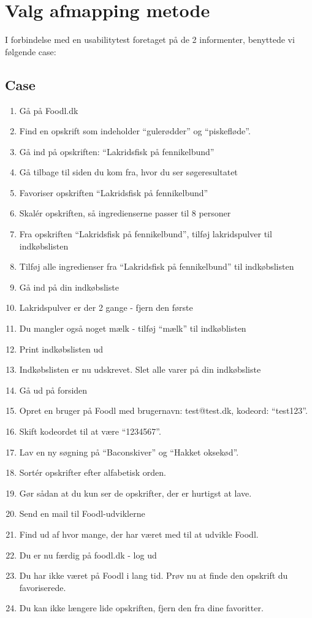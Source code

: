 \chapter{Valg afmapping metode}
\label{ap:usabilitytest}

I forbindelse med en usabilitytest foretaget på de 2 informenter, benyttede vi følgende case:

\section{Case}
\begin{enumerate}
\item Gå på Foodl.dk
\item Find en opskrift som indeholder ``gulerødder'' og ``piskefløde''.
\item Gå ind på opskriften: ``Lakridsfisk på fennikelbund''
\item Gå tilbage til siden du kom fra, hvor du ser søgeresultatet
\item Favoriser opskriften ``Lakridsfisk på fennikelbund''
\item Skalér opskriften, så ingredienserne passer til 8 personer
\item Fra opskriften ``Lakridsfisk på fennikelbund'', tilføj lakridspulver til indkøbslisten
\item Tilføj alle ingredienser fra ``Lakridsfisk på fennikelbund'' til indkøbslisten
\item Gå ind på din indkøbsliste
\item Lakridspulver er der 2 gange - fjern den første
\item Du mangler også noget mælk - tilføj ``mælk'' til indkøblisten
\item Print indkøbslisten ud
\item Indkøbslisten er nu udskrevet. Slet alle varer på din indkøbsliste
\item Gå ud på forsiden
\item Opret en bruger på Foodl med brugernavn: test@test.dk, kodeord: ``test123''.
\item Skift kodeordet til at være “1234567”.
\item Lav en ny søgning på ``Baconskiver'' og ``Hakket oksekød''.
\item Sortér opskrifter efter alfabetisk orden.
\item Gør sådan at du kun ser de opskrifter, der er hurtigst at lave.
\item Send en mail til Foodl-udviklerne
\item Find ud af hvor mange, der har været med til at udvikle Foodl.
\item Du er nu færdig på foodl.dk - log ud
\item Du har ikke været på Foodl i lang tid. Prøv nu at finde den opskrift du favoriserede.
\item Du kan ikke længere lide opskriften, fjern den fra dine favoritter.
\end{enumerate}
